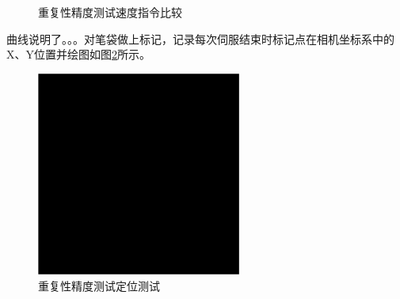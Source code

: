 \documentclass[fontset=fandol,type=bachelor,campus=harbin,bsmainpagenumberline=true]{hithesisbook}
\begin{document}
\begin{figure}[h]
{\begin{minipage}[h]{0.40\textwidth}
		\end{minipage}
		\label{重复性精度测试c}
	}
	\caption{重复性精度测试速度指令比较}
	\label{重复性精度测试速度指令比较}
\end{figure}


曲线说明了。。。对笔袋做上标记，记录每次伺服结束时标记点在相机坐标系中的X、Y位置并绘图如图\ref{重复性精度测试定位测试}所示。
\begin{figure}[h]
	\centering
	\includegraphics[width=0.6\textwidth]{chapter6/替身}
	\caption{重复性精度测试定位测试}
	\label{重复性精度测试定位测试}
\end{figure}
\end{document}
